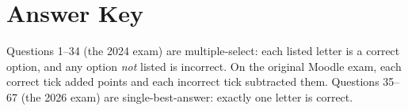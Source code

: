 \documentclass[11pt,oneside]{article}
\begin{document}
\newpage
\section*{Answer Key}

\begin{keybox}
Questions 1--34 (the 2024 exam) are multiple-select: each listed letter is a
correct option, and any option \emph{not} listed is incorrect. On the original
Moodle exam, each correct tick added points and each incorrect tick subtracted
them. Questions 35--67 (the 2026 exam) are single-best-answer: exactly one letter
is correct.
\end{keybox}
\end{document}

